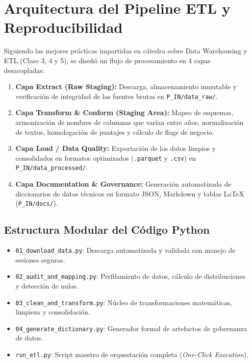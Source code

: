 \documentclass[11pt,a4paper]{article}
\begin{document}
\section{Arquitectura del Pipeline ETL y Reproducibilidad}
Siguiendo las mejores prácticas impartidas en cátedra sobre Data Warehousing y ETL (Clase 3, 4 y 5), se diseñó un flujo de procesamiento en 4 capas desacopladas:

\begin{enumerate}
    \item \textbf{Capa Extract (Raw Staging):} Descarga, almacenamiento inmutable y verificación de integridad de las fuentes brutas en \texttt{P\_IN/data\_raw/}.
    \item \textbf{Capa Transform \& Conform (Staging Area):} Mapeo de esquemas, armonización de nombres de columnas que varían entre años, normalización de textos, homologación de puntajes y cálculo de flags de negocio.
    \item \textbf{Capa Load / Data Quality:} Exportación de los datos limpios y consolidados en formatos optimizados (\texttt{.parquet} y \texttt{.csv}) en \texttt{P\_IN/data\_processed/}.
    \item \textbf{Capa Documentation \& Governance:} Generación automatizada de diccionarios de datos técnicos en formato JSON, Markdown y tablas \LaTeX{} (\texttt{P\_IN/docs/}).
\end{enumerate}

\subsection{Estructura Modular del Código Python}
\begin{itemize}
    \item \texttt{01\_download\_data.py}: Descarga automatizada y validada con manejo de sesiones seguras.
    \item \texttt{02\_audit\_and\_mapping.py}: Perfilamiento de datos, cálculo de distribuciones y detección de nulos.
    \item \texttt{03\_clean\_and\_transform.py}: Núcleo de transformaciones matemáticas, limpieza y consolidación.
    \item \texttt{04\_generate\_dictionary.py}: Generador formal de artefactos de gobernanza de datos.
    \item \texttt{run\_etl.py}: Script maestro de orquestación completa (\textit{One-Click Execution}).
\end{itemize}
\end{document}
